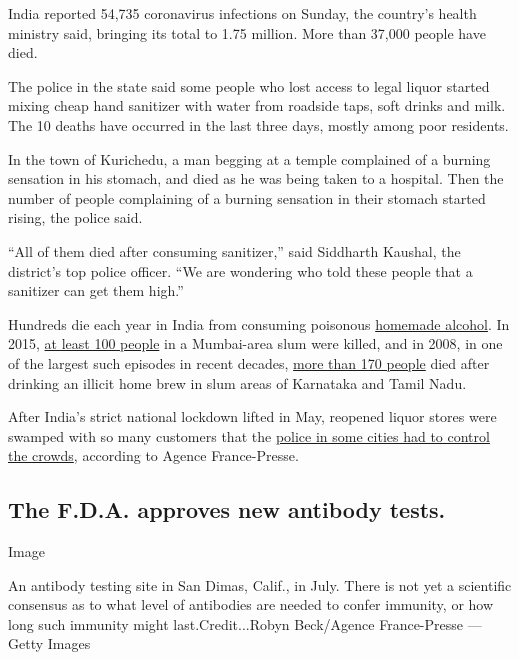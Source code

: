 India reported 54,735 coronavirus infections on Sunday, the country's
health ministry said, bringing its total to 1.75 million. More than
37,000 people have died.

The police in the state said some people who lost access to legal liquor
started mixing cheap hand sanitizer with water from roadside taps, soft
drinks and milk. The 10 deaths have occurred in the last three days,
mostly among poor residents.

In the town of Kurichedu, a man begging at a temple complained of a
burning sensation in his stomach, and died as he was being taken to a
hospital. Then the number of people complaining of a burning sensation
in their stomach started rising, the police said.

``All of them died after consuming sanitizer,'' said Siddharth Kaushal,
the district's top police officer. ``We are wondering who told these
people that a sanitizer can get them high.''

Hundreds die each year in India from consuming poisonous
\href{https://www.nytimes.com/2019/02/11/world/asia/india-toxic-alcohol.html}{homemade
alcohol}. In 2015,
\href{https://www.bbc.com/news/world-asia-india-33224514}{at least 100
people} in a Mumbai-area slum were killed, and in 2008, in one of the
largest such episodes in recent decades,
\href{https://timesofindia.indiatimes.com/city/chennai/TN-hooch-tragedy-21-cops-suspended/articleshow/3159848.cms?referral=PM}{more
than 170 people} died after drinking an illicit home brew in slum areas
of Karnataka and Tamil Nadu.

After India's strict national lockdown lifted in May, reopened liquor
stores were swamped with so many customers that the
\href{https://news.yahoo.com/chaos-outside-liquor-stores-india-eases-virus-lockdown-112326078.html}{police
in some cities had to control the crowds}, according to Agence
France-Presse.

\hypertarget{the-fda-approves-new-antibody-tests}{%
\subsection{The F.D.A. approves new antibody
tests.}\label{the-fda-approves-new-antibody-tests}}

Image

An antibody testing site in San Dimas, Calif., in July. There is not yet
a scientific consensus as to what level of antibodies are needed to
confer immunity, or how long such immunity might last.Credit...Robyn
Beck/Agence France-Presse --- Getty Images

